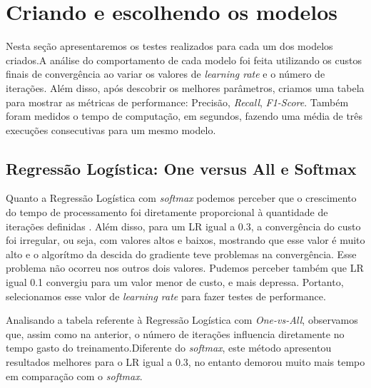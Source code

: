 \documentclass[conference]{IEEEtran}
\begin{document}

	
\section{Criando e escolhendo os modelos}

Nesta seção apresentaremos os testes realizados para cada um dos modelos criados.A análise do comportamento de cada modelo foi feita utilizando os custos finais de convergência ao variar os valores de \textit{learning rate} e o número de iterações. Além disso, após descobrir os melhores parâmetros, criamos uma tabela para mostrar as métricas de performance: Precisão, \textit{Recall}, \textit{F1-Score}. Também foram medidos o tempo de computação, em segundos, fazendo uma média de três execuções consecutivas para um mesmo modelo.

\subsection{Regressão Logística: One versus All e Softmax}

Quanto a Regressão Logística com \textit{softmax} podemos perceber que o crescimento do tempo de processamento foi diretamente proporcional à quantidade de iterações definidas%
. Além disso, para um LR igual a  0.3, a convergência do custo foi irregular, ou seja, com valores altos e baixos, mostrando que esse valor é muito alto e o algorítmo da descida do gradiente teve problemas na convergência. Esse problema não ocorreu nos outros dois valores. Pudemos perceber também que LR igual 0.1 convergiu para um valor menor de custo, e mais depressa. Portanto, selecionamos esse valor de \textit{learning rate} para fazer testes de performance. \par
Analisando a tabela referente à Regressão Logística com \textit{One-vs-All}, observamos que, assim como na anterior, o número de iterações influencia diretamente no tempo gasto do treinamento.Diferente do \textit{softmax}, este método apresentou resultados melhores para o LR igual a 0.3, no entanto demorou muito mais tempo em comparação com o \textit{softmax}.
\end{document}
